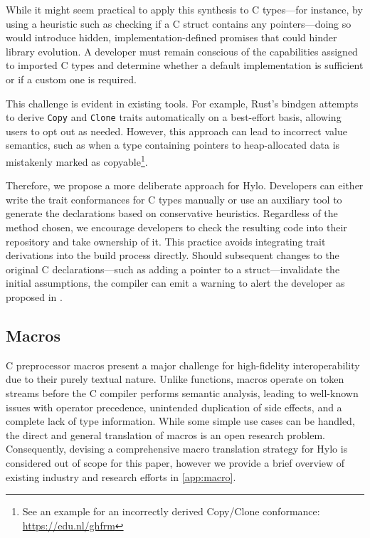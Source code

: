 While it might seem practical to apply this synthesis to C types—for instance, by using a heuristic such as checking if a C struct contains any pointers—doing so would introduce hidden, implementation-defined promises that could hinder library evolution. A developer must remain conscious of the capabilities assigned to imported C types and determine whether a default implementation is sufficient or if a custom one is required.

This challenge is evident in existing tools. For example, Rust's bindgen attempts to derive \texttt{Copy} and \texttt{Clone} traits automatically on a best-effort basis, allowing users to opt out as needed\cite{bindgen-nocopy}. However, this approach can lead to incorrect value semantics, such as when a type containing pointers to heap-allocated data is mistakenly marked as copyable\footnote{See an example for an incorrectly derived Copy/Clone conformance: \url{https://edu.nl/ghfrm}}.

Therefore, we propose a more deliberate approach for Hylo. Developers can either write the trait conformances for C types manually or use an auxiliary tool to generate the declarations based on conservative heuristics. Regardless of the method chosen, we encourage developers to check the resulting code into their repository and take ownership of it. This practice avoids integrating trait derivations into the build process directly. Should subsequent changes to the original C declarations—such as adding a pointer to a struct—invalidate the initial assumptions, the compiler can emit a warning to alert the developer as proposed in \cite{hylo-trait-ptr-conformance-warning}.

\subsection{Macros}
C preprocessor macros present a major challenge for high-fidelity interoperability due to their purely textual nature.  Unlike functions, macros operate on token streams before the C compiler performs semantic analysis, leading to well-known issues with operator precedence, unintended duplication of side effects, and a complete lack of type information.  While some simple use cases can be handled, the direct and general translation of macros is an open research problem.  Consequently, devising a comprehensive macro translation strategy for Hylo is considered out of scope for this paper, however we provide a brief overview of existing industry and research efforts in \autoref{app:macro}.

